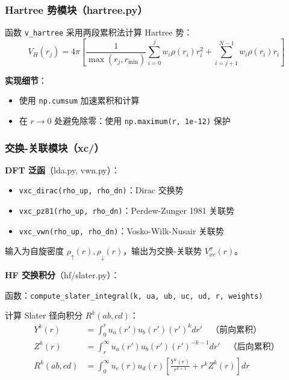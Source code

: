 \documentclass[12pt,a4paper]{article}
\begin{document}
\subsubsection{Hartree 势模块（hartree.py）}

函数 \texttt{v\_hartree} 采用两段累积法计算 Hartree 势：
\begin{equation}
    V_H(r_j) = 4\pi \left[ \frac{1}{\max(r_j, r_{\min})} \sum_{i=0}^{j} w_i \rho(r_i) r_i^2 + \sum_{i=j+1}^{N-1} w_i \rho(r_i) r_i \right]
\end{equation}

\textbf{实现细节}：
\begin{itemize}
    \item 使用 \texttt{np.cumsum} 加速累积和计算
    \item 在 $r \to 0$ 处避免除零：使用 \texttt{np.maximum(r, 1e-12)} 保护
\end{itemize}

\subsubsection{交换-关联模块（xc/）}

\textbf{DFT 泛函}（lda.py, vwn.py）：
\begin{itemize}
    \item \texttt{vxc\_dirac(rho\_up, rho\_dn)}：Dirac 交换势
    \item \texttt{vxc\_pz81(rho\_up, rho\_dn)}：Perdew-Zunger 1981 关联势
    \item \texttt{vxc\_vwn(rho\_up, rho\_dn)}：Vosko-Wilk-Nusair 关联势
\end{itemize}

输入为自旋密度 $\rho_\uparrow(r), \rho_\downarrow(r)$，输出为交换-关联势 $V_{xc}^\sigma(r)$。

\textbf{HF 交换积分}（hf/slater.py）：

函数：\texttt{compute\_slater\_integral(k, ua, ub, uc, ud, r, weights)}

计算 Slater 径向积分 $R^k(ab, cd)$：
\begin{align}
    Y^k(r)     & = \int_0^r u_a(r') u_b(r') (r')^k dr' \quad \text{（前向累积）}                           \\
    Z^k(r)     & = \int_r^\infty u_a(r') u_b(r') (r')^{-k-1} dr' \quad \text{（后向累积）}                 \\
    R^k(ab,cd) & = \int_0^\infty u_c(r) u_d(r) \left[ \frac{Y^k(r)}{r^{k+1}} + r^k Z^k(r) \right] dr
\end{align}
\end{document}
